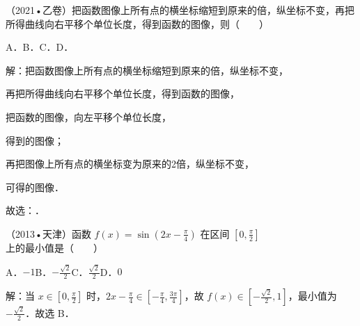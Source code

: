 \begin{question}
（2021•乙卷）把函数图像上所有点的横坐标缩短到原来的倍，纵坐标不变，再把所得曲线向右平移个单位长度，得到函数的图像，则（　　）\par
\qquad{}\qquad{}\qquad{}A．\qquad{}B．\qquad{}C．\qquad{}D．\par
\begin{solution}
解：把函数图像上所有点的横坐标缩短到原来的倍，纵坐标不变，\par
再把所得曲线向右平移个单位长度，得到函数的图像，\par
{}把函数的图像，向左平移个单位长度，\par
得到的图像；\par
再把图像上所有点的横坐标变为原来的2倍，纵坐标不变，\par
可得的图像．\par
故选：．\par
\end{solution}
\end{question}

\begin{question}
（2013•天津）函数 $f(x)=\sin(2x-\frac{\pi}{4})$ 在区间 $[0,\frac{\pi}{2}]$ 上的最小值是（　　）\par
A．$-1$\qquad B．$-\frac{\sqrt2}{2}$\qquad C．$\frac{\sqrt2}{2}$\qquad D．$0$\par
\begin{solution}
解：当 $x\in[0,\frac{\pi}{2}]$ 时，$2x-\frac{\pi}{4}\in[-\frac{\pi}{4},\frac{3\pi}{4}]$，故 $f(x)\in[-\frac{\sqrt2}{2},1]$，最小值为 $-\frac{\sqrt2}{2}$．故选 B．\par
\end{solution}
\end{question}

